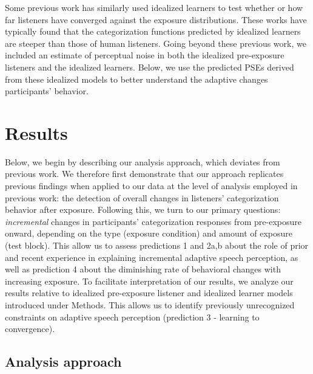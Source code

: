 \documentclass[
  11pt,
  man,mask,floatsintext]{apa6}
\begin{document}
Some previous work has similarly used idealized learners to test whether \autocite{bejjanki2011,clayards2008} or how far \autocite{kleinschmidt-jaeger2016,kleinschmidt2020} listeners have converged against the exposure distributions. These works have typically found that the categorization functions predicted by idealized learners are steeper than those of human listeners. Going beyond these previous work, we included an estimate of perceptual noise \autocite[obtained in][]{kronrod2016} in both the idealized pre-exposure listeners and the idealized learners. Below, we use the predicted PSEs derived from these idealized models to better understand the adaptive changes participants' behavior.

\section{Results}\label{sec:results}

Below, we begin by describing our analysis approach, which deviates from previous work. We therefore first demonstrate that our approach replicates previous findings when applied to our data at the level of analysis employed in previous work: the detection of overall changes in listeners' categorization behavior after exposure. Following this, we turn to our primary questions: \emph{incremental} changes in participants' categorization responses from pre-exposure onward, depending on the type (exposure condition) and amount of exposure (test block). This allow us to assess predictions 1 and 2a,b about the role of prior and recent experience in explaining incremental adaptive speech perception, as well as prediction 4 about the diminishing rate of behavioral changes with increasing exposure. To facilitate interpretation of our results, we analyze our results relative to idealized pre-exposure listener and idealized learner models introduced under Methods. This allows us to identify previously unrecognized constraints on adaptive speech perception (prediction 3 - learning to convergence).

\subsection{Analysis approach}\label{analysis-approach}
\end{document}
